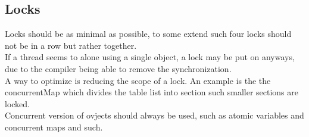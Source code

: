 \documentclass[12pt, a4paper]{article}
\begin{document}
		\subsection{Locks}
			Locks should be as minimal as possible, to some extend such four locks should not be in a row but rather together.\\
			If a thread seems to alone using a single object, a lock may be put on anyways, due to the compiler being able to remove the synchronization.\\
			A way to optimize is reducing the scope of a lock. An example is the the concurrentMap which divides the table list into section such smaller sections are locked.\\
			Concurrent version of ovjects should always be used, such as atomic variables and concurrent maps and such.\\
\end{document}
